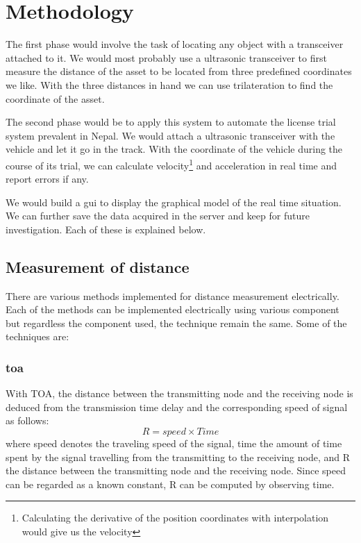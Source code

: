 \section{Methodology}
The first phase would involve the task of locating any object with a transceiver attached to it. We would most probably use a ultrasonic transceiver to first measure the distance of the asset to be located from three predefined coordinates we like. With the three distances in hand we can use trilateration to find the coordinate of the asset.

The second phase would be to apply this system to automate the license trial system prevalent  in Nepal. We would attach a ultrasonic transceiver with the vehicle and let it go in the track. With the coordinate of the vehicle during the course of its trial, we can calculate velocity\footnote{Calculating the derivative of the position coordinates with interpolation would give us the velocity} and acceleration in real time and report errors if any. 

We would build a \gls{gui} to display the graphical model of the real time situation. We can further save the data acquired in the server and keep for future investigation. Each of these is explained below.

\subsection{Measurement of distance}
There are various methods implemented for distance measurement electrically. Each of the methods can be implemented electrically using various component but regardless the component used, the technique remain the same. Some of the techniques are:
\subsubsection{\gls{toa}}
With TOA, the distance between the transmitting node and the receiving node is deduced from the transmission time delay and the corresponding speed of signal as follows:
\begin{equation}
	R = speed \times Time
\end{equation}
where speed denotes the traveling speed of the signal, time the amount of time spent by the signal travelling from the transmitting to the receiving node, and R the distance between the transmitting node and the receiving node. Since speed can be regarded as a known constant, R can be computed by observing time.\cite{1003.1833}

